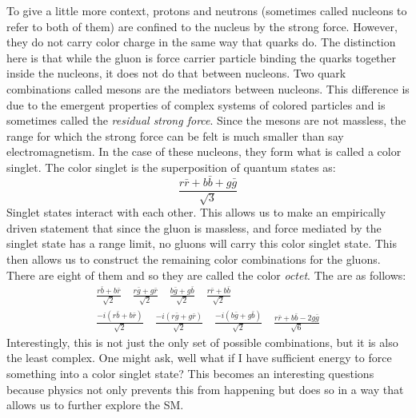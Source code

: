 To give a little more context, protons and neutrons (sometimes called nucleons to refer to both of them) are confined to the nucleus by the strong force.
However, they do not carry color charge in the same way that quarks do. The distinction here is that while the gluon is force carrier particle binding the quarks together inside the nucleons, it does not do that between nucleons.
Two quark combinations called mesons are the mediators between nucleons. This difference is due to the emergent properties of complex systems of colored particles and is sometimes called the \textit{residual strong force}. 
Since the mesons are not massless, the range for which the strong force can be felt is much smaller than say electromagnetism. In the case of these nucleons, they form what is called a color singlet. 
The color singlet is the superposition of quantum states as:
\begin{equation}
   \frac{r \bar{r} + b \bar{b} + g \bar{g}}{\sqrt{3}}
\end{equation}
Singlet states interact with each other. This allows us to make an empirically driven statement that since the gluon is massless, and force mediated by the singlet state has a range limit, no gluons will carry this color singlet state.
This then allows us to construct the remaining color combinations for the gluons. There are eight of them and so they are called the color \textit{octet}.
The are as follows:
\begin{gather}
   \frac{r \bar{b} + b \bar{r}}{\sqrt{2}} \quad \frac{r \bar{g} + g \bar{r}}{\sqrt{2}} \quad \frac{b \bar{g} + g \bar{b}}{\sqrt{2}} \quad \frac{r \bar{r} + b \bar{b}}{\sqrt{2}} \nonumber\\
   \frac{-i(r \bar{b} + b \bar{r})}{\sqrt{2}} \quad \frac{-i(r \bar{g} + g \bar{r})}{\sqrt{2}} \quad \frac{-i(b \bar{g} + g \bar{b})}{\sqrt{2}} \quad \frac{r \bar{r} + b \bar{b} - 2g \bar{g}}{\sqrt{6}}
   \label{eq:eq_colorOctet}
\end{gather}
Interestingly, this is not just the only set of possible combinations, but it is also the least complex. One might ask, well what if I have sufficient energy to force something into a color singlet state?
This becomes an interesting questions because physics not only prevents this from happening but does so in a way that allows us to further explore the SM.\\

